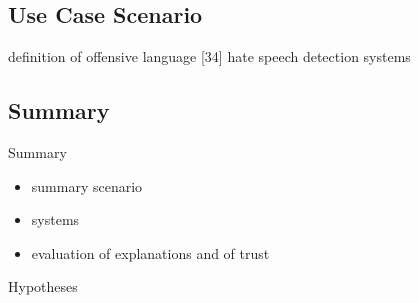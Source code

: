 \subsection{Use Case Scenario}
definition of offensive language [34] \newline
hate speech detection systems \newline








\subsection{Summary}
Summary\newline
\begin{itemize}
	\item summary scenario
	\item systems
	\item evaluation of explanations and of trust
\end{itemize}
Hypotheses













